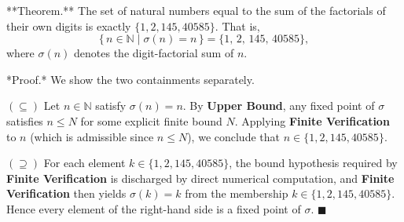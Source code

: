 **Theorem.** The set of natural numbers equal to the sum of the factorials of their own digits is exactly $\{1, 2, 145, 40585\}$. That is,
$$\{\, n \in \mathbb{N} \mid \sigma(n) = n \,\} = \{1,\, 2,\, 145,\, 40585\},$$
where $\sigma(n)$ denotes the digit-factorial sum of $n$.

*Proof.* We show the two containments separately.

$(\subseteq)$ Let $n \in \mathbb{N}$ satisfy $\sigma(n) = n$. By \textbf{Upper Bound}, any fixed point of $\sigma$ satisfies $n \leq N$ for some explicit finite bound $N$. Applying \textbf{Finite Verification} to $n$ (which is admissible since $n \leq N$), we conclude that $n \in \{1, 2, 145, 40585\}$.

$(\supseteq)$ For each element $k \in \{1, 2, 145, 40585\}$, the bound hypothesis required by \textbf{Finite Verification} is discharged by direct numerical computation, and \textbf{Finite Verification} then yields $\sigma(k) = k$ from the membership $k \in \{1, 2, 145, 40585\}$. Hence every element of the right-hand side is a fixed point of $\sigma$. $\blacksquare$